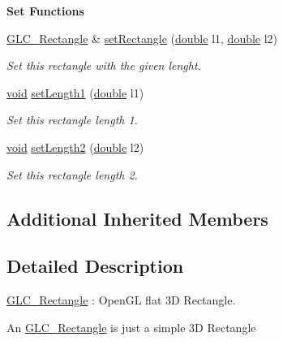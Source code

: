 \begin{Indent}{\bf Set Functions}\par
\begin{DoxyCompactItemize}
\item 
\hyperlink{class_g_l_c___rectangle}{G\-L\-C\-\_\-\-Rectangle} \& \hyperlink{class_g_l_c___rectangle_aa8fde86d5c99db19e05311ce8007fa7b}{set\-Rectangle} (\hyperlink{_super_l_u_support_8h_a8956b2b9f49bf918deed98379d159ca7}{double} l1, \hyperlink{_super_l_u_support_8h_a8956b2b9f49bf918deed98379d159ca7}{double} l2)
\begin{DoxyCompactList}\small\item\em Set this rectangle with the given lenght. \end{DoxyCompactList}\item 
\hyperlink{group___u_a_v_objects_plugin_ga444cf2ff3f0ecbe028adce838d373f5c}{void} \hyperlink{class_g_l_c___rectangle_a4ab46b7614d0c0ff056af4c09f16fdd1}{set\-Length1} (\hyperlink{_super_l_u_support_8h_a8956b2b9f49bf918deed98379d159ca7}{double} l1)
\begin{DoxyCompactList}\small\item\em Set this rectangle length 1. \end{DoxyCompactList}\item 
\hyperlink{group___u_a_v_objects_plugin_ga444cf2ff3f0ecbe028adce838d373f5c}{void} \hyperlink{class_g_l_c___rectangle_a3401e0e68e1225e38b16c9d72c4d25c0}{set\-Length2} (\hyperlink{_super_l_u_support_8h_a8956b2b9f49bf918deed98379d159ca7}{double} l2)
\begin{DoxyCompactList}\small\item\em Set this rectangle length 2. \end{DoxyCompactList}\end{DoxyCompactItemize}
\end{Indent}
\subsection*{Additional Inherited Members}


\subsection{Detailed Description}
\hyperlink{class_g_l_c___rectangle}{G\-L\-C\-\_\-\-Rectangle} \-: Open\-G\-L flat 3\-D Rectangle. 

An \hyperlink{class_g_l_c___rectangle}{G\-L\-C\-\_\-\-Rectangle} is just a simple 3\-D Rectangle 

